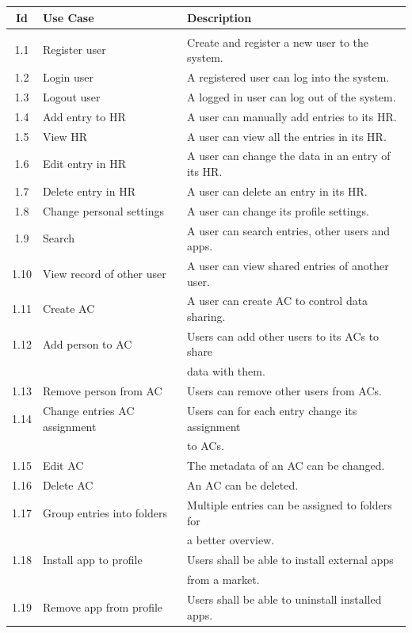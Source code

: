 \begin{table}[ht]
  \centering
	\begin{tabular}{c l l}
	Id & Use Case & Description \\
	\hline
	\\
	1.1 & Register user & Create and register a new user to the system. \\ 
	1.2 & Login user &  A registered user can log into the system.\\
	1.3 & Logout user &  A logged in user can log out of the system.\\
	1.4 & Add entry to HR & A user can manually add entries to its HR. \\
	1.5 & View HR & A user can view all the entries in its HR. \\
	1.6 & Edit entry in HR & A user can change the data in an entry of its HR. \\
	1.7 & Delete entry in HR & A user can delete an entry in its HR. \\
	1.8 & Change personal settings & A user can change its profile settings. \\
	1.9 & Search & A user can search entries, other users and apps. \\
	1.10 & View record of other user & A user can view shared entries of another user.  \\
	1.11 & Create AC & A user can create AC to control data sharing. \\
	1.12 & Add person to AC & Users can add other users to its ACs to share  \\
	 & & data with them. \\
	1.13 & Remove person from AC & Users can remove other users from ACs. \\
	1.14 & Change entries AC assignment & Users can for each entry change its assignment  \\
	 & & to ACs. \\
	1.15 & Edit AC & The metadata of an AC can be changed. \\
	1.16 & Delete AC & An AC can be deleted. \\
	1.17 & Group entries into folders & Multiple entries can be assigned to folders for  \\
	 & & a better overview. \\
	1.18 & Install app to profile & Users shall be able to install external apps  \\
	 & & from a market. \\
	1.19 & Remove app from profile & Users shall be able to uninstall installed apps. \\

\end{tabular}
\end{table}
